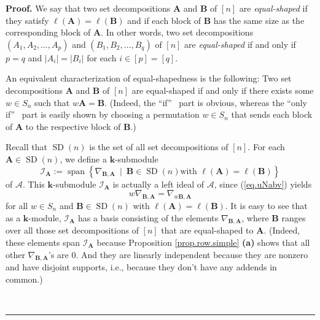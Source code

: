 \documentclass[numbers=enddot,12pt,final,onecolumn,notitlepage]{scrartcl}%
\numberwithin{exer}{subsection}
\theoremstyle{definition}
\newenvironment{proof}[1][Proof]{\noindent\textbf{#1.} }{\ \rule{0.5em}{0.5em}}
\begin{document}
\begin{proof}
We say that two set decompositions $\mathbf{A}$ and $\mathbf{B}$ of $\left[
n\right]  $ are \emph{equal-shaped} if they satisfy $\ell\left(
\mathbf{A}\right)  =\ell\left(  \mathbf{B}\right)  $ and if each block of
$\mathbf{B}$ has the same size as the corresponding block of $\mathbf{A}$. In
other words, two set decompositions $\left(  A_{1},A_{2},\ldots,A_{p}\right)
$ and $\left(  B_{1},B_{2},\ldots,B_{q}\right)  $ of $\left[  n\right]  $ are
\emph{equal-shaped} if and only if $p=q$ and $\left\vert A_{i}\right\vert
=\left\vert B_{i}\right\vert $ for each $i\in\left[  p\right]  =\left[
q\right]  $.

An equivalent characterization of equal-shapedness is the following: Two set
decompositions $\mathbf{A}$ and $\mathbf{B}$ of $\left[  n\right]  $ are
equal-shaped if and only if there exists some $w\in S_{n}$ such that
$w\mathbf{A}=\mathbf{B}$. (Indeed, the \textquotedblleft if\textquotedblright%
\ part is obvious, whereas the \textquotedblleft only if\textquotedblright%
\ part is easily shown by choosing a permutation $w\in S_{n}$ that sends each
block of $\mathbf{A}$ to the respective block of $\mathbf{B}$.)

Recall that $\operatorname*{SD}\left(  n\right)  $ is the set of all set
decompositions of $\left[  n\right]  $. For each $\mathbf{A}\in
\operatorname*{SD}\left(  n\right)  $, we define a $\mathbf{k}$-submodule%
\[
\mathcal{I}_{\mathbf{A}}:=\operatorname*{span}\left\{  \nabla_{\mathbf{B}%
,\mathbf{A}}\ \mid\ \mathbf{B}\in\operatorname*{SD}\left(  n\right)  \text{
with }\ell\left(  \mathbf{A}\right)  =\ell\left(  \mathbf{B}\right)  \right\}
\]
of $\mathcal{A}$. This $\mathbf{k}$-submodule $\mathcal{I}_{\mathbf{A}}$ is
actually a left ideal of $\mathcal{A}$, since (\ref{eq.uNabv}) yields%
\begin{equation}
w\nabla_{\mathbf{B},\mathbf{A}}=\nabla_{w\mathbf{B},\mathbf{A}}
\label{pf.thm.AnnVkn.wNab}%
\end{equation}
for all $w\in S_{n}$ and $\mathbf{B}\in\operatorname*{SD}\left(  n\right)  $
with $\ell\left(  \mathbf{A}\right)  =\ell\left(  \mathbf{B}\right)  $. It is
easy to see that as a $\mathbf{k}$-module, $\mathcal{I}_{\mathbf{A}}$ has a
basis consisting of the elements $\nabla_{\mathbf{B},\mathbf{A}}$, where
$\mathbf{B}$ ranges over all those set decompositions of $\left[  n\right]  $
that are equal-shaped to $\mathbf{A}$. (Indeed, these elements span
$\mathcal{I}_{\mathbf{A}}$ because Proposition \ref{prop.row.simple}
\textbf{(a)} shows that all other $\nabla_{\mathbf{B},\mathbf{A}}$'s are $0$.
And they are linearly independent because they are nonzero and have disjoint
supports, i.e., because they don't have any addends in common.)


\end{proof}
\end{document}
